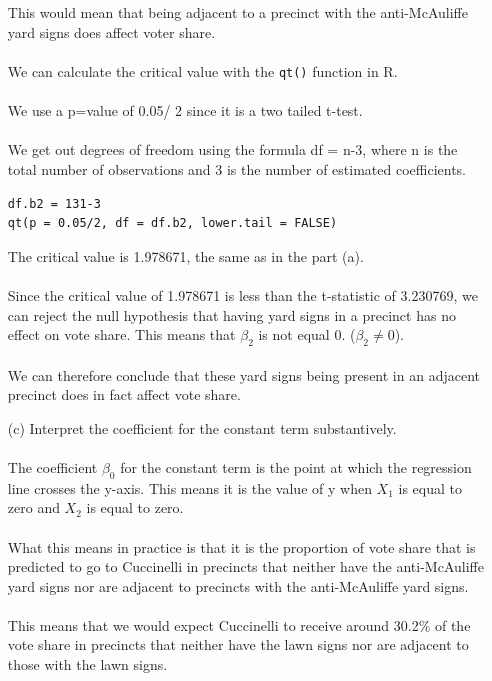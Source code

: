 \documentclass[12pt,letterpaper]{article}
\begin{document}
\begin{enumerate}
\\\\
\noindent This would mean that being adjacent to a precinct with the anti-McAuliffe yard signs does affect voter share. 
\\\\
\noindent We can calculate the critical value with the \texttt{qt()} function in R.
\\\\
\noindent We use a p=value of 0.05/ 2 since it is a two tailed t-test.
\\\\
\noindent We get out degrees of freedom using the formula df = n-3, where n is the total number of observations and 3 is the number of estimated coefficients.
\begin{lstlisting}
df.b2 = 131-3
qt(p = 0.05/2, df = df.b2, lower.tail = FALSE)
\end{lstlisting}
\noindent The critical value is 1.978671, the same as in the part (a).
\\\\
\noindent Since the critical value of 1.978671 is less than the t-statistic of 3.230769, we can reject the null hypothesis that having yard signs in a precinct has no effect on vote share. This means that $\beta_2$ is not equal 0. ($\beta_2 \neq 0$).
\\\\
\noindent We can therefore conclude that these yard signs being present in an adjacent precinct does in fact affect vote share.

\newpage
	\vspace{7cm}
	\item [(c)] Interpret the coefficient for the constant term substantively.
\\\\
\noindent The coefficient $\beta_0$ for the constant term is the point at which the regression line crosses the y-axis. This means it is the value of y when $X_1$ is equal to zero and $X_2$ is equal to zero.
\\\\
\noindent What this means in practice is that it is the proportion of vote share that is predicted to go to Cuccinelli in precincts that neither have the anti-McAuliffe yard signs nor are adjacent to precincts with the anti-McAuliffe yard signs.
\\\\
\noindent This means that we would expect Cuccinelli to receive around 30.2\% of the vote share in precincts that neither have the lawn signs nor are adjacent to those with the lawn signs.


\end{enumerate}
\end{document}
